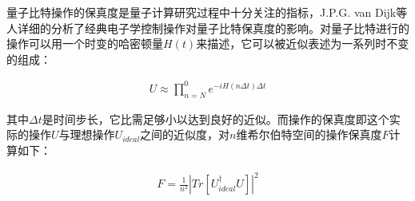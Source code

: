 量子比特操作的保真度是量子计算研究过程中十分关注的指标，J.P.G. van Dijk等人\cite[]{van_Dijk_Kawakami_Schouten_Veldhorst_Vandersypen_Babaie_Charbon_Sebastiano_2019}详细的分析了经典电子学控制操作对量子比特保真度的影响。对量子比特进行的操作可以用一个时变的哈密顿量$H(t)$来描述，它可以被近似表述为一系列时不变的组成：

\begin{align}
    U\approx \prod_{n=N}^{0} e^{-iH(n\Delta t)\Delta t}
\end{align}

其中$\Delta t$是时间步长，它比需足够小以达到良好的近似。而操作的保真度即这个实际的操作$U$与理想操作$U_{ideal}$之间的近似度，对$n$维希尔伯特空间的操作保真度$F$计算如下：

\begin{align}
    F=\frac{1}{n^2}\left|Tr\left[U_{ideal}^{\dagger}U\right]\right|^2
\end{align}





